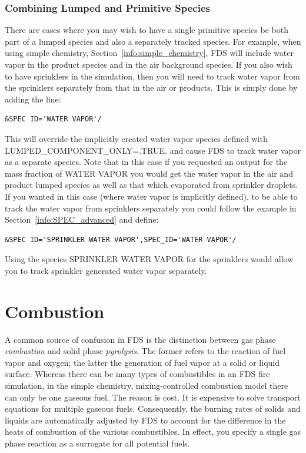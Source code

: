 \documentclass[11pt]{book}
\begin{document}
\subsection{Combining Lumped and Primitive Species}

There are cases where you may wish to have a single primitive species be both part of a lumped species and also a separately tracked species.  For example, when using simple chemistry, Section~\ref{info:simple_chemistry}, FDS will include water vapor in the product species and in the air background species.  If you also wish to have sprinklers in the simulation, then you will need to track water vapor from the sprinklers separately from that in the air or products.  This is simply done by adding the line:

\begin{lstlisting}
&SPEC ID='WATER VAPOR'/
\end{lstlisting}
This will override the implicitly created water vapor species defined with {\ct LUMPED\_COMPONENT\_ONLY=.TRUE.} and cause FDS to track water vapor as a separate species.  Note that in this case if you requested an output for the mass fraction of {\ct WATER VAPOR} you would get the water vapor in the air and product lumped species as well as that which evaporated from sprinkler droplets.  If you wanted in this case (where water vapor is implicitly defined), to be able to track the water vapor from sprinklers separately you could follow the example in Section~\ref{info:SPEC_advanced} and define:

\begin{lstlisting}
&SPEC ID='SPRINKLER WATER VAPOR',SPEC_ID='WATER VAPOR'/
\end{lstlisting}
Using the species  {\ct SPRINKLER WATER VAPOR} for the sprinklers would allow you to track sprinkler generated water vapor separately.

\chapter{Combustion}

\label{chap:combustion}
\label{info:REAC}

A common source of confusion in FDS is the distinction between gas phase {\em combustion} and solid phase {\em pyrolysis}. The former
refers to the reaction of fuel vapor and oxygen; the latter the generation of fuel vapor at a solid or liquid surface. Whereas there
can be many types of combustibles in an FDS fire simulation, in the simple chemistry, mixing-controlled combustion model there can only be one gaseous fuel. The reason is cost.
It is expensive to
solve transport equations for multiple gaseous fuels. Consequently, the burning rates of solids and liquids are automatically adjusted by
FDS to account for the difference in the heats of combustion of the various combustibles. In effect, you specify a single gas phase
reaction as a surrogate for all potential fuels.
\end{document}
